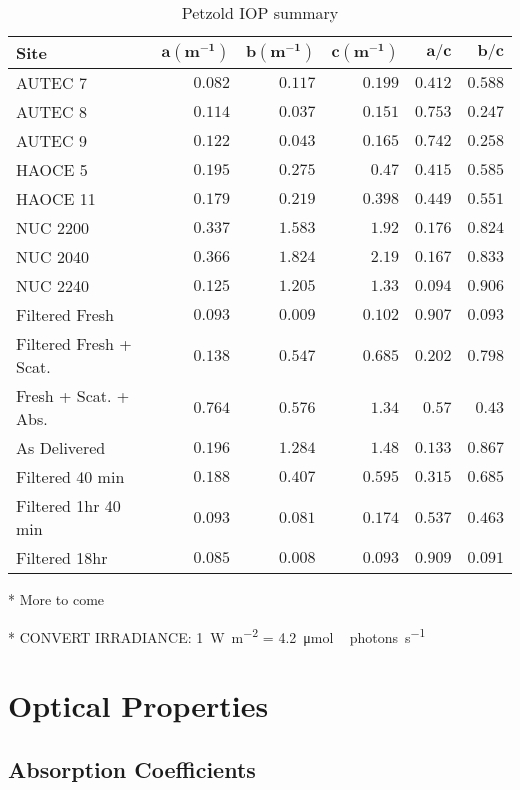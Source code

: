 \begin{table}
  \centering
  \begin{tabular}{lrrrrr}
    \toprule
    \textbf{Site} & $\bm{a (\mbox{m}^{-1})}$ & $\bm{b (\mbox{m}^{-1})}$ & $\bm{c(\mbox{m}^{-1} )}$ & $\bm{a/c}$ & $\bm{b/c}$ \\
    \midrule
    AUTEC 7 & $0.082$ & $0.117$ & $0.199$ & $0.412$ & $0.588$ \\
    AUTEC 8 & $0.114$ & $0.037$ & $0.151$ & $0.753$ & $0.247$ \\
    AUTEC 9 & $0.122$ & $0.043$ & $0.165$ & $0.742$ & $0.258$ \\
    HAOCE 5 & $0.195$ & $0.275$ & $0.47$ & $0.415$ & $0.585$ \\
    HAOCE 11 & $0.179$ & $0.219$ & $0.398$ & $0.449$ & $0.551$ \\
    NUC 2200 & $0.337$ & $1.583$ & $1.92$ & $0.176$ & $0.824$ \\
    NUC 2040 & $0.366$ & $1.824$ & $2.19$ & $0.167$ & $0.833$ \\
    NUC 2240 & $0.125$ & $1.205$ & $1.33$ & $0.094$ & $0.906$ \\
    Filtered Fresh & $0.093$ & $0.009$ & $0.102$ & $0.907$ & $0.093$ \\
    Filtered Fresh + Scat.  & $0.138$ & $0.547$ & $0.685$ & $0.202$ & $0.798$ \\
    Fresh + Scat. + Abs.& $0.764$ & $0.576$ & $1.34$ & $0.57$ & $0.43$ \\
    As Delivered & $0.196$ & $1.284$ & $1.48$ & $0.133$ & $0.867$ \\
    Filtered 40 min & $0.188$ & $0.407$ & $0.595$ & $0.315$ & $0.685$ \\
    Filtered 1hr 40 min & $0.093$ & $0.081$ & $0.174$ & $0.537$ & $0.463$ \\
    Filtered 18hr & $0.085$ & $0.008$ & $0.093$ & $0.909$ & $0.091$ \\
    \bottomrule
    \end{tabular}
  \caption{Petzold IOP summary}
\end{table}

* More to come

* CONVERT IRRADIANCE: \SI{1}{\W\per\m^2} = \SI{4.2}{\micro\mole \,photons\per\second}

\section{Optical Properties}
\subsection{Absorption Coefficients}
